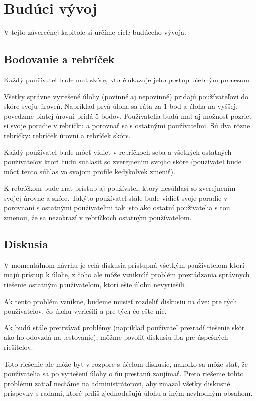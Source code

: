 \chapter{Budúci vývoj}
V tejto záverečnej kapitole si určíme ciele budúceho vývoja.

\section{Bodovanie a rebríček}
\label{score}
Každý používateľ bude mať skóre, ktoré ukazuje jeho postup učebným procesom.

Všetky správne vyriešené úlohy (povinné aj nepovinné)
pridajú používateľovi do skóre svoju úroveň. Napríklad prvá úloha sa ráta za
1 bod a úloha na vyššej, povedzme piatej úrovni pridá 5 bodov.
\newline
\newline
Používatelia budú mať aj možnosť pozrieť si svoje poradie v rebríčku a porovnať sa
s ostatnými používateľmi. Sú dva rôzne rebríčky: rebríček úrovní a rebríček skóre.

Každý používateľ bude môcť vidieť v rebríčkoch seba a všetkých ostatných používateľov ktorí
budú súhlasiť so zverejnením svojho skóre (používateľ bude môcť tento súhlas vo svojom profile kedykoľvek zmeniť).

K rebríčkom bude mať prístup aj používateľ, ktorý nesúhlasí so zverejnením svojej úrovne a skóre.
Takýto používateľ stále bude vidieť svoje poradie v porovnaní s ostatnými používateľmi tak isto
ako ostatní používatelia s tou zmenou, že sa nezobrazí v rebríčkoch ostatným používateľom.

\section{Diskusia}
\label{future:disc}
V momentálnom návrhu je celá diskusia prístupná všetkým používateľom ktorí majú
prístup k úlohe, z čoho ale môže vzniknúť problém prezrádzania správnych riešenie
ostatným používateľom, ktorí ešte úlohu nevyriešili.

Ak tento problém vznikne, budeme musieť rozdeliť diskusiu na dve: pre tých používateľov, čo úlohu vyriešili a pre tých čo ešte nie.

Ak budú stále pretrvávať problémy (napríklad používateľ prezradí riešenie skôr ako ho odovzdá na testovanie),
môžme povoliť diskusiu iba pre úspešných riešiteľov.

Toto riešenie ale môže byť v rozpore s účelom diskusie, nakoľko sa môže stať, že používatelia sa po vyriešení úlohy
o ňu prestanú zaujímať. Preto riešenie tohto problému zatiaľ necháme na administrátorovi, aby zmazal všetky diskusné
príspevky s radami, ktoré príliš zjednodušujú úlohu a iným nevhodným obsahom.


